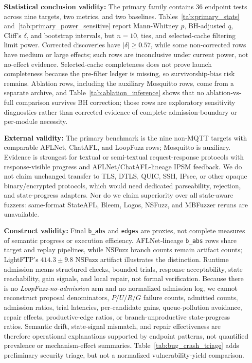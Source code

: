 \documentclass[final,5p,times,number]{elsarticle}
\begin{document}
\textbf{Statistical conclusion validity:} The primary family contains 36 endpoint tests across nine targets, two metrics, and two baselines. Tables~\ref{tab:primary_stats} and~\ref{tab:primary_power_sensitive} report Mann-Whitney $p$, BH-adjusted $q$, Cliff's $\delta$, and bootstrap intervals, but $n=10$, ties, and selected-cache filtering limit power. Corrected discoveries have $|\delta|\ge0.57$, while some non-corrected rows have medium or large effects; such rows are inconclusive under current power, not no-effect evidence. Selected-cache completeness does not prove launch completeness because the pre-filter ledger is missing, so survivorship-bias risk remains. Ablation rows, including the auxiliary Mosquitto rows, come from a separate archive, and Table~\ref{tab:ablation_inference} shows that no ablation-vs-full comparison survives BH correction; those rows are exploratory sensitivity diagnostics rather than corrected evidence of complete admission-boundary or per-module necessity.

\textbf{External validity:} The primary benchmark is the nine non-MQTT targets with comparable AFLNet, ChatAFL, and LoopFuzz rows; Mosquitto is auxiliary. Evidence is strongest for textual or semi-textual request-response protocols with response-visible progress and AFLNet/ChatAFL-lineage IPSM feedback. We do not claim unchanged transfer to TLS, DTLS, QUIC, SSH, IPsec, or other opaque binary/encrypted protocols, which would need dedicated parseability, rejection, and state-progress adapters. Nor do we claim superiority over all state-aware fuzzers: same-format StateAFL, Bleem, Logos, NSFuzz, and MBFuzzer reruns are unavailable.

\textbf{Construct validity:} Final \texttt{b\_abs} and \texttt{edges} are proxies, not complete measures of semantic progress or execution efficiency. AFLNet-lineage \texttt{b\_abs} rows share target and replay pipelines, while NSFuzz branch counts remain artifact counts; LightFTP's $414.3{\pm}9.8$ NSFuzz artifact illustrates the distinction. Runtime admission means structured checks, bounded trials, response acceptability, state reachability, gain signals, and local repair, not formal verification. Because there is no \emph{LoopFuzz-no-admission} arm and no normalized admission log, we cannot reconstruct proposal denominators, $P/U/R/G$ failure counts, admitted counts, admission ratios, trial latencies, per-candidate gains, queue-pollution avoidance, repair effects, productive-edge ratios, or branch-unproductive state-progress ratios. Semantic drift, state-signal mismatch, and repair effectiveness are therefore operational explanations supported by endpoint patterns, not quantified prevalence or mechanism-effect summaries. Table~\ref{tab:bug_crash_triage} adds preliminary security triage, but not a normalized vulnerability-yield comparison.
\end{document}
